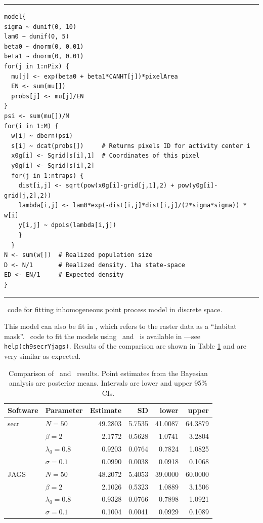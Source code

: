 \begin{panel}%
\centering
\rule[0.15in]{\textwidth}{.03in}
\begin{small}
\begin{verbatim}
model{
sigma ~ dunif(0, 10)
lam0 ~ dunif(0, 5)
beta0 ~ dnorm(0, 0.01)
beta1 ~ dnorm(0, 0.01)
for(j in 1:nPix) {
  mu[j] <- exp(beta0 + beta1*CANHT[j])*pixelArea
  EN <- sum(mu[])
  probs[j] <- mu[j]/EN
}
psi <- sum(mu[])/M
for(i in 1:M) {
  w[i] ~ dbern(psi)
  s[i] ~ dcat(probs[])     # Returns pixels ID for activity center i
  x0g[i] <- Sgrid[s[i],1]  # Coordinates of this pixel
  y0g[i] <- Sgrid[s[i],2]
  for(j in 1:ntraps) {
    dist[i,j] <- sqrt(pow(x0g[i]-grid[j,1],2) + pow(y0g[i]-grid[j,2],2))
    lambda[i,j] <- lam0*exp(-dist[i,j]*dist[i,j]/(2*sigma*sigma)) * w[i]
    y[i,j] ~ dpois(lambda[i,j])
    }
  }
N <- sum(w[])  # Realized population size
D <- N/1       # Realized density. 1ha state-space
ED <- EN/1     # Expected density
}
\end{verbatim}
\end{small}
\rule[0.15in]{\textwidth}{.03in}
\caption{\bugs~code for fitting inhomogeneous point process model in
  discrete space.}
\label{ch9.panel1}
\end{panel}

This model can also be fit in \secr, which refers
to the raster data as a ``habitat mask''. \R~code to
fit the models using \secr~and \jags~is available in \scrbook---see
\verb#help(ch9secrYjags)#. Results of the
comparison are shown in Table \ref{ch9:tab:secrYjags} and are
very similar as expected.

\begin{table}[h!]
\centering
\caption{Comparison of \secr~and \jags~results. Point estimates from
  the Bayesian analysis are posterior means. Intervals are lower and
  upper 95\% CIs.}
\begin{tabular}{llrrrr}
\hline
Software & Parameter & Estimate & SD & lower & upper \\
\hline
 secr & $N=50$ & 49.2803 & 5.7535 & 41.0087 & 64.3879 \\
      & $\beta=2$ &  2.1772 & 0.5628 &  1.0741 &  3.2804 \\
      & $\lambda_0=0.8$ &  0.9203 & 0.0764 &  0.7824 &  1.0825 \\
      & $\sigma=0.1$ &  0.0990 & 0.0038 &  0.0918 &  0.1068 \\
\hline
 JAGS & $N=50$ & 48.2072 & 5.4053 & 39.0000 & 60.0000 \\
      & $\beta=2$ &  2.1026 & 0.5323 &  1.0889 &  3.1506 \\
      & $\lambda_0=0.8$ &  0.9328 & 0.0766 &  0.7898 &  1.0921 \\
      & $\sigma=0.1$ &  0.1004 & 0.0041 &  0.0929 &  0.1089 \\
\hline
\end{tabular}
\label{ch9:tab:secrYjags}
\end{table}


